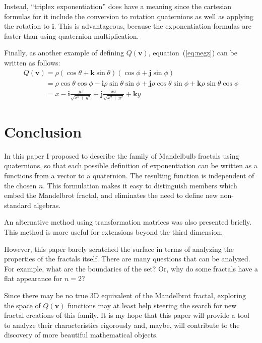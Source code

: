 \documentclass{article}
\let\vec\mathbf
\newcommand{\mathnewline}[1][\quad]{\\\phantom{#1}}
\begin{document}
Instead, ``triplex exponentiation'' does have a meaning since the
cartesian formulas for it include the conversion to rotation
quaternions as well as applying the rotation to $\vec{i}$.  This is
advantageous, because the exponentiation
formulas are faster than using quaternion multiplication.

Finally, as another example of defining $Q(\vec{v})$,
equation~(\ref{eq:negz}) can be written as follows:
\begin{equation*}
  \begin{array}{l}
  Q(\vec{v}) = \rho (\cos \theta + \vec{k} \sin \theta) (\cos \phi + \vec{j} \sin \phi)
  \mathnewline[Q(\vec{v})] = \rho \cos \theta \cos \phi - \vec{i} \rho \sin \theta \sin \phi + \vec{j} \rho \cos \theta \sin \phi + \vec{k} \rho \sin \theta \cos \phi
  \mathnewline[Q(\vec{v})] = x - \vec{i}\frac{y z}{\sqrt{x^2 + y^2}} + \vec{j}\frac{x z}{\sqrt{x^2 + y^2}} + \vec{k} y
  \end{array}
\end{equation*}

\section{Conclusion}

In this paper I proposed to describe the family of Mandelbulb fractals
using quaternions, so that each possible definition of exponentiation
can be written as a functions from a vector to a quaternion.  The
resulting function is independent of the chosen $n$.  This formulation
makes it easy to distinguish members which embed the Mandelbrot
fractal, and eliminates the need to define new non-standard algebras.

An alternative method using transformation matrices was also presented
briefly.  This method is more useful for extensions beyond the third
dimension.

However, this paper barely scratched the surface in terms of analyzing
the properties of the fractals itself.  There are many questions that
can be analyzed.  For example, what are the boundaries of the set?
Or, why do some fractals have a flat appearance for $n = 2$?

Since there may be no true 3D equivalent of the Mandelbrot fractal,
exploring the space of $Q(\vec{v})$ functions may at least help
steering the search for new fractal creations of this family.  It is
my hope that this paper will provide a tool to analyze their
characteristics rigorously and, maybe, will contribute to the
discovery of more beautiful mathematical objects.
\end{document}
